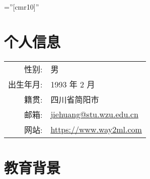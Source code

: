 \documentclass[a4paper,10pt]{article} %
\begin{document}
\font\fb=''[cmr10]'' %

\par{\bigskip\par} %

\section{个人信息}

\begin{tabular}{rl}
\textsc{性别:}                  	& 男 \\
\textsc{出生年月:} 	        & 1993 年 2 月  \\
\textsc{籍贯:} 					& 四川省简阳市  \\
\textsc{邮箱:} 					& \href{mailto:jiehuang@stu.wzu.edu.cn}{jiehuang@stu.wzu.edu.cn} \\
\textsc{网站:}                   & \href{https://www.way2ml.com}{https://www.way2ml.com}\\
\end{tabular}



\section{教育背景}
\end{document}
